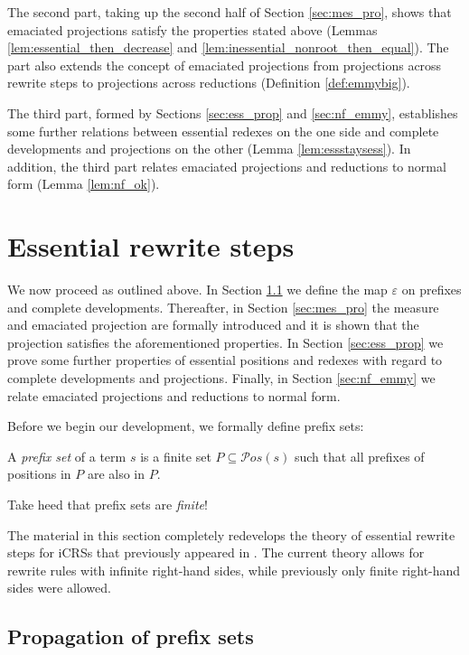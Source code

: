 \documentclass{LMCS}
\theoremstyle{definition}
\newcommand{\pos}[1]{\mathcal{P}os(#1)}
\newcommand{\pmap}{\varepsilon}
\begin{document}
The second part, taking up the second half of Section \ref{sec:mes_pro}, shows that emaciated projections satisfy the properties stated above (Lemmas \ref{lem:essential_then_decrease} and \ref{lem:inessential_nonroot_then_equal}). The part also extends the concept of emaciated projections from projections across rewrite steps to projections across reductions (Definition \ref{def:emmybig}).

The third part, formed by Sections \ref{sec:ess_prop} and \ref{sec:nf_emmy}, establishes some further relations between essential redexes on the one side and complete developments and projections on the other (Lemma \ref{lem:essstaysess}). In addition, the third part relates emaciated projections and reductions to normal form (Lemma \ref{lem:nf_ok}).

\section{Essential rewrite steps}
\label{sec:ess}

We now proceed as outlined above. In Section \ref{sec:prop_pre} we define the map $\pmap$ on prefixes and complete developments. Thereafter, in Section \ref{sec:mes_pro} the measure and emaciated projection are formally introduced and it is shown that the projection satisfies the aforementioned properties. In Section \ref{sec:ess_prop} we prove some further properties of essential positions and redexes with regard to complete developments and projections. Finally, in Section \ref{sec:nf_emmy} we relate emaciated projections and reductions to normal form.

Before we begin our development, we formally define prefix sets:
\begin{defi}
A \emph{prefix set} of a term $s$ is a finite set $P \subseteq \pos{s}$ such that all prefixes of positions in $P$ are also in $P$.
\end{defi}

\noindent
Take heed that prefix sets are \emph{finite}!

\begin{rem}
The material in this section completely redevelops the theory of essential rewrite steps for iCRSs that previously appeared in \cite{JJ05b}. The current theory allows for rewrite rules with infinite right-hand sides, while previously only finite right-hand sides were allowed.
\end{rem}

\subsection{Propagation of prefix sets}
\label{sec:prop_pre}
\end{document}
